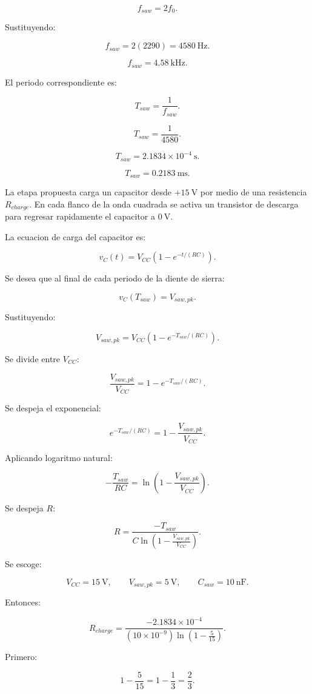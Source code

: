 \documentclass[11pt,letterpaper]{article}
\begin{document}
\[
f_{saw}=2f_0.
\]

Sustituyendo:

\[
f_{saw}=2(2290)=4580~\text{Hz}.
\]

\[
\boxed{f_{saw}=4.58~\text{kHz}}.
\]

El periodo correspondiente es:

\[
T_{saw}=\frac{1}{f_{saw}}.
\]

\[
T_{saw}=\frac{1}{4580}.
\]

\[
T_{saw}=2.1834\times 10^{-4}~\text{s}.
\]

\[
T_{saw}=0.2183~\text{ms}.
\]

La etapa propuesta carga un capacitor desde \(+15~\text{V}\) por medio de una
resistencia \(R_{charge}\). En cada flanco de la onda cuadrada se activa un
transistor de descarga para regresar rapidamente el capacitor a \(0~\text{V}\).

La ecuacion de carga del capacitor es:

\[
v_C(t)=V_{CC}\left(1-e^{-t/(RC)}\right).
\]

Se desea que al final de cada periodo de la diente de sierra:

\[
v_C(T_{saw})=V_{saw,pk}.
\]

Sustituyendo:

\[
V_{saw,pk}
=
V_{CC}\left(1-e^{-T_{saw}/(RC)}\right).
\]

Se divide entre \(V_{CC}\):

\[
\frac{V_{saw,pk}}{V_{CC}}
=
1-e^{-T_{saw}/(RC)}.
\]

Se despeja el exponencial:

\[
e^{-T_{saw}/(RC)}
=
1-\frac{V_{saw,pk}}{V_{CC}}.
\]

Aplicando logaritmo natural:

\[
-\frac{T_{saw}}{RC}
=
\ln\left(1-\frac{V_{saw,pk}}{V_{CC}}\right).
\]

Se despeja \(R\):

\[
R=
\frac{-T_{saw}}
{C\ln\left(1-\frac{V_{saw,pk}}{V_{CC}}\right)}.
\]

Se escoge:

\[
V_{CC}=15~\text{V},
\qquad
V_{saw,pk}=5~\text{V},
\qquad
C_{saw}=10~\text{nF}.
\]

Entonces:

\[
R_{charge}
=
\frac{-2.1834\times 10^{-4}}
{(10\times 10^{-9})\ln\left(1-\frac{5}{15}\right)}.
\]

Primero:

\[
1-\frac{5}{15}
=
1-\frac{1}{3}
=
\frac{2}{3}.
\]
\end{document}
